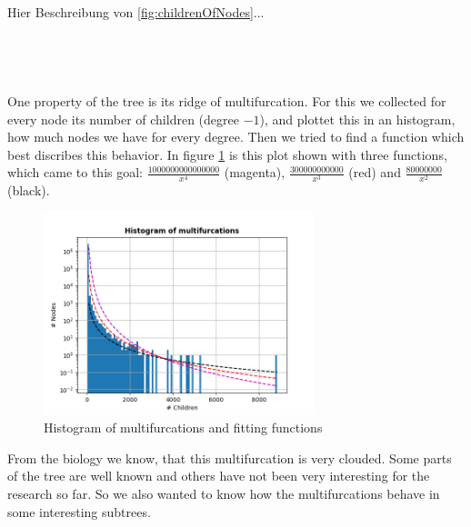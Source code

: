       Hier Beschreibung von \ref{fig:childrenOfNodes}... \\

       \\
       \\
       \\
       \\
      One property of the tree is its ridge of multifurcation. For this we collected for every node its
        number of children (degree $-1$), and plottet this in an histogram, how much nodes we have for 
        every degree. Then we tried to find a function which best discribes this behavior. In figure 
        \ref{fig:HistogramsOfMultifurcations} is this plot shown with three functions, which came 
         to this goal: $\frac{1000000000000000}{x^4}$ (magenta), 
        $\frac{300000000000}{x^3}$ (red) and $\frac{80000000}{x^2}$ (black). \\
      \begin{figure}[h]
        \caption{Histogram of multifurcations and fitting functions}
        \centering
        \label{fig:HistogramsOfMultifurcations}
        \includegraphics[width=0.7\textwidth]{Figures/HistogramsOfMultifurcations.png}
      \end{figure}
      From the biology we know, that this multifurcation is very clouded. Some parts of the tree are 
        well known and others have not been very interesting for the research so far. So we also wanted 
        to know how the multifurcations behave in some interesting subtrees. \\
       \\
       \\
       \\

